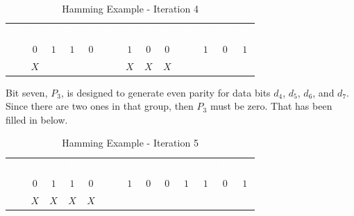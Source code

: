 \begin{table}[H]
  \sffamily
  \newcommand{\head}[1]{\textcolor{white}{\textbf{#1}}}		
  \begin{center}
    \begin{tabular}{ccccccccccccc} 
      \rowcolor{black!75}
      \head{$ P_4 $} & \head{$ d_7 $} & \head{$ d_6 $} &
      \head{$ d_5 $} & \head{$ d_4 $} & \head{$ P_3 $} &
      \head{$ d_3 $} & \head{$ d_2 $} & \head{$ d_1 $} &
      \head{$ P_2 $} & \head{$ d_0 $} & \head{$ P_1 $} &
      \head{$ P_0 $} \\
      \color{gray}{$ 0 $} & $ 0 $ & $ 1 $ &
      $ 1 $ & $ 0 $ & \color{gray}{$ 0 $} &
      $ 1 $ & $ 0 $ & $ 0 $ &
      \color{red}{$ 1 $} & $ 1 $ & $ 0 $ &
      $ 1 $ \\
      \color{gray}{$ 0 $} & $ X $ & \color{gray}{$ 0 $} &
      \color{gray}{$ 0 $} & \color{gray}{$ 0 $} & \color{gray}{$ 0 $} &
      $ X $ & $ X $ & $ X $ &
      \color{red}{$ P $} & \color{gray}{$ 0 $} & \color{gray}{$ 0 $} &
      \color{gray}{$ 0 $} \\
    \end{tabular}
  \end{center}
  \caption{Hamming Example - Iteration 4}
  \label{cl:tab:hamming_example_iteration_4}
\end{table}

Bit seven, $ P_3 $, is designed to generate even parity for data bits $ d_4 $, $ d_5 $, $ d_6 $, and $ d_7 $. Since there are two ones in that group, then $ P_3 $ must be zero. That has been filled in below. 

\begin{table}[H]
  \sffamily
  \newcommand{\head}[1]{\textcolor{white}{\textbf{#1}}}		
  \begin{center}
    \begin{tabular}{ccccccccccccc} 
      \rowcolor{black!75}
      \head{$ P_4 $} & \head{$ d_7 $} & \head{$ d_6 $} &
      \head{$ d_5 $} & \head{$ d_4 $} & \head{$ P_3 $} &
      \head{$ d_3 $} & \head{$ d_2 $} & \head{$ d_1 $} &
      \head{$ P_2 $} & \head{$ d_0 $} & \head{$ P_1 $} &
      \head{$ P_0 $} \\
      \color{gray}{$ 0 $} & $ 0 $ & $ 1 $ &
      $ 1 $ & $ 0 $ & \color{red}{$ 0 $} &
      $ 1 $ & $ 0 $ & $ 0 $ &
      $ 1 $ & $ 1 $ & $ 0 $ &
      $ 1 $ \\
      \color{gray}{$ 0 $} & $ X $ & $ X $ &
      $ X $ & $ X $ & \color{red}{$ P $} &
      \color{gray}{$ 0 $} & \color{gray}{$ 0 $} & \color{gray}{$ 0 $} &
      \color{gray}{$ 0 $} & \color{gray}{$ 0 $} & \color{gray}{$ 0 $} &
      \color{gray}{$ 0 $} \\
    \end{tabular}
  \end{center}
  \caption{Hamming Example - Iteration 5}
  \label{cl:tab:hamming_example_iteration_5}
\end{table}


